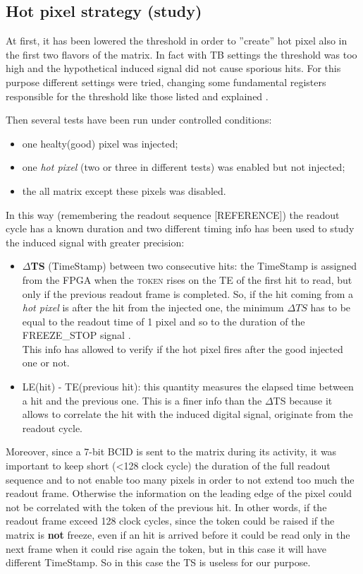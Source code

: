 \subsection{Hot pixel strategy (study)}

At first, it has been lowered the threshold in order to ''create'' hot pixel also in the first two flavors of the matrix. In fact with TB settings the threshold was too high and the hypothetical induced signal did not cause sporious hits. For this purpose different settings were tried, changing some fundamental registers responsible for the threshold like those listed and explained . 

Then several tests have been run under controlled conditions:
\begin{itemize}
\item one healty(good) pixel was injected;
\item one \textit{hot pixel} (two or three in different tests) was enabled but not injected;
\item the all matrix except these pixels was disabled.
\end{itemize}

In this way (remembering the readout sequence [REFERENCE]) the readout cycle has a known duration and two different timing info has been used to study the induced signal with greater precision:

\begin{itemize}
\item \textbf{$\Delta$TS} (TimeStamp) between two consecutive hits: the TimeStamp is assigned from the FPGA when the \textsc{token} rises on the TE of the first hit to read, but only if the previous readout frame is completed. So, if the hit coming from a \textit{hot pixel} is after the hit from the injected one, the minimum $\Delta TS$ has to be equal to the readout time of 1 pixel and so to the duration of the \textsc{FREEZE\_STOP} signal .\\
This info has allowed to verify if the hot pixel fires after the good injected one or not.
\item LE(hit) - TE(previous hit): this quantity measures the elapsed time between a hit and the previous one. This is a finer info than the $\Delta$TS because it allows to correlate the hit with the induced digital signal, originate from the readout cycle.
\end{itemize}

Moreover, since a 7-bit BCID is sent to the matrix during its activity, it was important to keep short (<128 clock cycle) the duration of the full readout sequence and to not enable too many pixels in order to not extend too much the readout frame. Otherwise the information on the leading edge of the pixel could not be correlated with the token of the previous hit. In other words, if the readout frame exceed 128 clock cycles, since the token could be raised if the matrix is \textbf{not} freeze, even if an hit is arrived before it could be read only in the next frame when it could rise again the token, but in this case it will have different TimeStamp. So in this case the TS is useless for our purpose.



